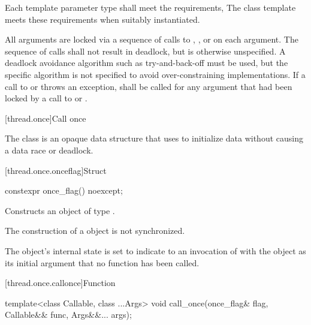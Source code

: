 \begin{itemdescr}
\pnum
\requires Each template parameter type shall meet the  requirements,
\enternote The
 class template meets these requirements when suitably instantiated.
\exitnote

\pnum
\effects All arguments are locked via a sequence of calls to ,
, or  on each argument. The sequence of calls shall
not result in deadlock, but is otherwise unspecified. \enternote A deadlock avoidance
algorithm such as try-and-back-off must be used, but the specific algorithm is not
specified to avoid over-constraining implementations. \exitnote If a call to
 or  throws an exception,  shall be
called for any argument that had been locked by a call to  or
.
\end{itemdescr}

[thread.once]{Call once}

The class  is an opaque data structure that  uses to
initialize data without causing a data race or deadlock.

[thread.once.onceflag]{Struct }

%
\begin{itemdecl}
constexpr once_flag() noexcept;
\end{itemdecl}

\begin{itemdescr}
\pnum\effects Constructs an object of type .

\pnum\sync The construction of a  object is not synchronized.

\pnum\postcondition The object's internal state is set to indicate to an invocation of
 with the object as its initial argument that no function has been
called.
\end{itemdescr}

[thread.once.callonce]{Function }

%
\begin{itemdecl}
template<class Callable, class ...Args>
  void call_once(once_flag& flag, Callable&& func, Args&&... args);
\end{itemdecl}

